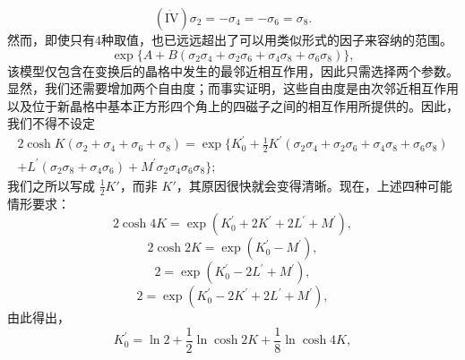 \begin{equation}\tag{14.2.48}\label{eq:14.2.48}
\left( \dot { \mathrm { I V } } \right) \sigma _ { 2 } = - \sigma _ { 4 } = - \sigma _ { 6 } = \sigma _ { 8 } .
\end{equation}
然而，即使只有4种取值，也已远远超出了可以用类似形式的因子来容纳的范围。
\begin{equation}\tag{14.2.49}\label{eq:14.2.49}
\exp \{ A + B ( \sigma _ { 2 } \sigma _ { 4 } + \sigma _ { 2 } \sigma _ { 6 } + \sigma _ { 4 } \sigma _ { 8 } + \sigma _ { 6 } \sigma _ { 8 } ) \} ,
\end{equation}
该模型仅包含在变换后的晶格中发生的最邻近相互作用，因此只需选择两个参数。显然，我们还需要增加两个自由度；而事实证明，这些自由度是由次邻近相互作用以及位于新晶格中基本正方形四个角上的四磁子之间的相互作用所提供的。因此，我们不得不设定
\begin{equation}\tag{14.2.50}\label{eq:14.2.50}
\begin{array}{r} { 2 \cosh K ( \sigma _ { 2 } + \sigma _ { 4 } + \sigma _ { 6 } + \sigma _ { 8 } ) = \exp \{ K _ { 0 } ^{\prime} + \frac { 1 } { 2 } K ^{\prime} ( \sigma _ { 2 } \sigma _ { 4 } + \sigma _ { 2 } \sigma _ { 6 } + \sigma _ { 4 } \sigma _ { 8 } + \sigma _ { 6 } \sigma _ { 8 } ) } \\{ + L ^{\prime} ( \sigma _ { 2 } \sigma _ { 8 } + \sigma _ { 4 } \sigma _ { 6 } ) + M ^{\prime} \sigma _ { 2 } \sigma _ { 4 } \sigma _ { 6 } \sigma _ { 8 } \} ; } \end{array}
\end{equation}
我们之所以写成 \(\frac{1}{2}K'\)，而非 \(K'\)，其原因很快就会变得清晰。现在，上述四种可能情形要求：
\begin{equation}\tag{14.2.51}\label{eq:14.2.51}
2 \cosh 4 K = \exp ( K _ { 0 } ^{\prime} + 2 K ^{\prime} + 2 L ^{\prime} + M ^{\prime} ) ,
\end{equation}
\begin{equation}\tag{14.2.52}\label{eq:14.2.52}
2 \cosh 2 K = \exp ( K _ { 0 } ^{\prime} - M ^{\prime} ) ,
\end{equation}
\begin{equation}\tag{14.2.53}\label{eq:14.2.53}
2 = \exp ( K _ { 0 } ^{\prime} - 2 L ^{\prime} + M ^{\prime} ) ,
\end{equation}
\begin{equation}\tag{14.2.54}\label{eq:14.2.54}
2 = \exp ( K _ { 0 } ^{\prime} - 2 K ^{\prime} + 2 L ^{\prime} + M ^{\prime} ) ,
\end{equation}
由此得出，
\begin{equation}\tag{14.2.55}\label{eq:14.2.55}
K _ { 0 } ^{\prime} = \ln 2 + \frac { 1 } { 2 } \ln \cosh 2 K + \frac { 1 } { 8 } \ln \cosh 4 K ,
\end{equation}
